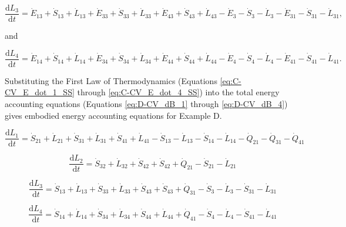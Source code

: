 \documentclass[authoryear,preprint,review,12pt]{elsarticle}
\begin{document}
\begin{equation} \label{eq:D-CV_dB_3}
	\frac{\mathrm{d}L_{3}}{\mathrm{d}t} 	 = \dot{E}_{13} + \dot{S}_{13} + \dot{L}_{13} + \dot{E}_{33} + \dot{S}_{33} + \dot{L}_{33}+ \dot{E}_{43} + \dot{S}_{43} + \dot{L}_{43} - \dot{E}_{3} - \dot{S}_{3} - \dot{L}_{3} - \dot{E}_{31} - \dot{S}_{31} - \dot{L}_{31},
\end{equation}

\noindent and 

\begin{equation} \label{eq:D-CV_dB_4}
	\frac{\mathrm{d}L_{4}}{\mathrm{d}t} 	 = \dot{E}_{14} + \dot{S}_{14} + \dot{L}_{14} + \dot{E}_{34} + \dot{S}_{34} + \dot{L}_{34}+ \dot{E}_{44} + \dot{S}_{44} + \dot{L}_{44} - \dot{E}_{4} - \dot{S}_{4} - \dot{L}_{4} - \dot{E}_{41} - \dot{S}_{41} - \dot{L}_{41}.
\end{equation}

Substituting the First Law of Thermodynamics (Equations \ref{eq:C-CV_E_dot_1_SS} through \ref{eq:C-CV_E_dot_4_SS}) into the total energy accounting equations (Equations \ref{eq:D-CV_dB_1} through \ref{eq:D-CV_dB_4}) gives embodied energy accounting equations for Example D.

\begin{equation} \label{eq:D-embodied_acct_1}
	\frac{\mathrm{d}L_{1}}{\mathrm{d}t} 	 = \dot{S}_{21} + \dot{L}_{21} + \dot{S}_{31} + \dot{L}_{31} + \dot{S}_{41} + \dot{L}_{41} - \dot{S}_{13} - \dot{L}_{13} - \dot{S}_{14} -  \dot{L}_{14} - \dot{Q}_{21} - \dot{Q}_{31} - \dot{Q}_{41}
\end{equation}

\begin{equation} \label{eq:D-embodied_acct_2}
	\frac{\mathrm{d}L_{2}}{\mathrm{d}t} 	 = \dot{S}_{32} +  \dot{L}_{32} + \dot{S}_{42} +  \dot{S}_{42} + \dot{Q}_{21} - \dot{S}_{21} -  \dot{L}_{21}
\end{equation}

\begin{equation} \label{eq:D-embodied_acct_3}
	\frac{\mathrm{d}L_{3}}{\mathrm{d}t} 	 = \dot{S}_{13} +  \dot{L}_{13} + \dot{S}_{33} +  \dot{L}_{33} + \dot{S}_{43} +  \dot{S}_{43} + \dot{Q}_{31} - \dot{S}_{3} -  \dot{L}_{3} - \dot{S}_{31} -  \dot{L}_{31}
\end{equation}

\begin{equation} \label{eq:D-embodied_acct_4}
	\frac{\mathrm{d}L_{4}}{\mathrm{d}t}	 = \dot{S}_{14} +  \dot{L}_{14} + \dot{S}_{34} +  \dot{L}_{34} + \dot{S}_{44} +  \dot{L}_{44} + \dot{Q}_{41} - \dot{S}_{4} -  \dot{L}_{4} - \dot{S}_{41} -  \dot{L}_{41}
\end{equation}
\end{document}
